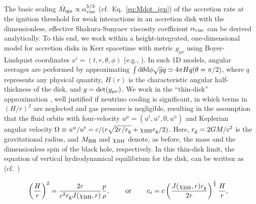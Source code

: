 The basic scaling $\dot{M}_{\rm ign}\propto \alpha_{\rm visc}^{5/3}$ (cf.~Eq.~\eqref{eq:Mdot_ign}) of the accretion rate at the ignition threshold for weak interactions in an accretion disk with the dimensionless, effective Shakura-Sunyaev viscosity coefficient $\alpha_{\rm visc}$ can be derived analytically. To this end, we work within a height-integrated, one-dimensional model for accretion disks in Kerr spacetime with metric $g_{\mu\nu}$ using Boyer-Lindquist coordinates $x^i = (t,r,\theta, \phi)$ (e.g., \cite{beloborodov_super-eddington_1998,gammie_advection-dominated_1998,chen_neutrino-cooled_2007}). In such 1D models, angular averages are performed by approximating $\int {\rm d}\theta {\rm d}\phi \sqrt{g} q \simeq 4\pi H q(\theta = \pi/2)$, where $q$ represents any physical quantity, $H(r)$ is the characteristic angular half-thickness of the disk, and $g = {\rm det}(g_{\mu\nu})$. We work in the ``thin-disk'' approximation \cite{shakura_black_1973,bardeen_rotating_1972,novikov_astrophysics_1973}, well justified if neutrino cooling is significant, in which terms in $(H/r)^2$ are neglected and gas pressure is negligible, resulting in the assumption that the fluid orbits with four-velocity $u^\mu = (u^t,u^r, 0, u^\phi)$ and Keplerian angular velocity $\Omega \equiv u^\phi/u^t = c/(r\sqrt{2r/r_{\rm g}} + \chi_{\rm BH} r_{\rm g}/2)$. Here, $r_{\rm g}=2GM/c^2$ is the gravitational radius, and $M_{\rm BH}$ and $\chi_{\rm BH}$ denote, as before, the mass and the dimensionless spin of the black hole, respectively. In this thin-disk limit, the equation of vertical hydrodynamical equilibrium for the disk, can be written as (cf.~\cite{abramowicz_accretion_1997,beloborodov_super-eddington_1998})

\begin{equation}
	\left(\frac{H}{r}\right)^2 = \frac{2 r}{c^2 r_{\rm g} J(\chi_{\rm BH},r)}\frac{p}{\rho},\mskip40mu \text{or} \mskip40mu c_{\rm s} = c\left(\frac{J(\chi_{\rm BH},r) r_{\rm g}}{2r}\right)^{\frac{1}{2}}\frac{H}{r}, \label{eq:vertical_equilibrium}
\end{equation}

